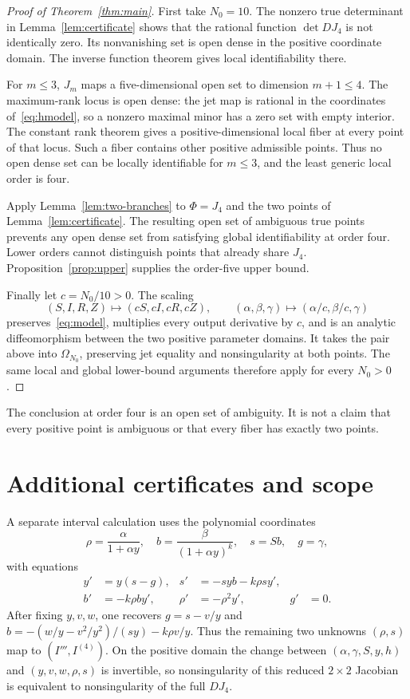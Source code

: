 \documentclass[10pt,a4paper]{article}
\begin{document}
\begin{proof}[Proof of Theorem~\ref{thm:main}]
First take $N_0=10$. The nonzero true determinant in
Lemma~\ref{lem:certificate} shows that the rational function
$\det DJ_4$ is not identically zero. Its nonvanishing set is open
dense in the positive coordinate domain. The inverse function theorem
gives local identifiability there.

For $m\leq3$, $J_m$ maps a five-dimensional open set to dimension
$m+1\leq4$. The maximum-rank locus is open dense: the jet map is
rational in the coordinates of~\eqref{eq:hmodel}, so a nonzero
maximal minor has a zero set with empty interior. The constant rank
theorem gives a positive-dimensional local fiber at every point of
that locus. Such a fiber contains other positive admissible points.
Thus no open dense set can be locally identifiable for $m\leq3$,
and the least generic local order is four.

Apply Lemma~\ref{lem:two-branches} to $\Phi=J_4$ and the two points
of Lemma~\ref{lem:certificate}. The resulting open set of ambiguous
true points prevents any open dense set from satisfying global
identifiability at order four. Lower orders cannot distinguish points
that already share $J_4$. Proposition~\ref{prop:upper} supplies the
order-five upper bound.

Finally let $c=N_0/10>0$. The scaling
\begin{equation}
(S,I,R,Z)\mapsto(cS,cI,cR,cZ),\qquad
(\alpha,\beta,\gamma)\mapsto(\alpha/c,\beta/c,\gamma)
\label{eq:scale}
\end{equation}
preserves~\eqref{eq:model}, multiplies every output derivative by $c$,
and is an analytic diffeomorphism between the two positive parameter
domains. It takes the pair above into $\Omega_{N_0}$, preserving
jet equality and nonsingularity at both points. The same local and
global lower-bound arguments therefore apply for every $N_0>0$.
\end{proof}
The conclusion at order four is an open set of ambiguity. It is not
a claim that every positive point is ambiguous or that every fiber
has exactly two points.

\section{Additional certificates and scope}
\label{sec:scope}
A separate interval calculation uses the polynomial coordinates
\[
\rho=\frac{\alpha}{1+\alpha y},\quad b=\frac{\beta}{(1+\alpha y)^k},
\quad s=Sb,\quad g=\gamma,
\]
with equations
\begin{equation}
\begin{aligned}
y'&=y(s-g),&s'&=-syb-k\rho s y',\\
b'&=-k\rho b y',&\rho'&=-\rho^2y',&g'&=0.
\end{aligned}
\label{eq:polynomial}
\end{equation}
After fixing $y,v,w$, one recovers
$g=s-v/y$ and
$b=-(w/y-v^2/y^2)/(sy)-k\rho v/y$.
Thus the remaining two unknowns $(\rho,s)$ map to
$(I''',I^{(4)})$. On the positive domain the change between
$(\alpha,\gamma,S,y,h)$ and $(y,v,w,\rho,s)$ is invertible,
so nonsingularity of this reduced $2\times2$ Jacobian is equivalent
to nonsingularity of the full $DJ_4$.
\end{document}
